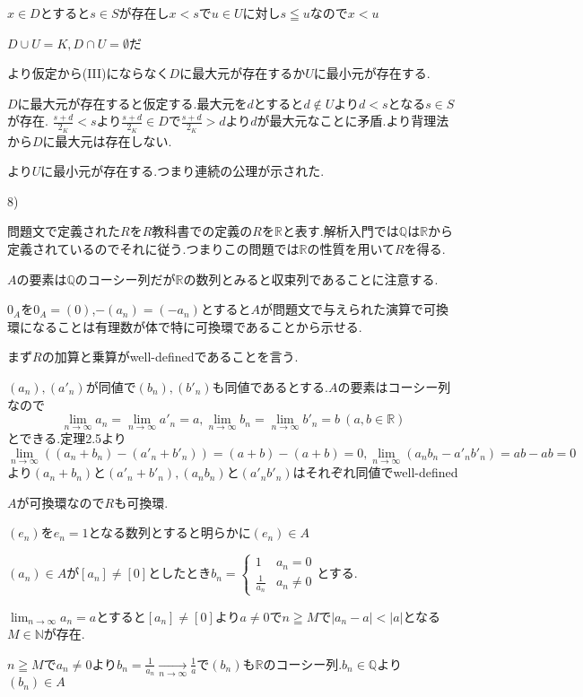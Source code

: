 \documentclass{jsarticle}
\begin{document}
 $x\in D$とすると$s\in S$が存在し$x < s$で$u\in U$に対し$s\leqq u$なので$x < u$
 
 $D\cup U = K,D\cap U=\emptyset$だ
 
 より仮定から(III)にならなく$D$に最大元が存在するか$U$に最小元が存在する.
 
 $D$に最大元が存在すると仮定する.最大元を$d$とすると$d\notin U$より$d < s$となる$s\in S$が存在.
 $\frac{s+d}{2_K}<s$より$\frac{s+d}{2_K}\in D$で$\frac{s+d}{2_K}>d$より$d$が最大元なことに矛盾.より背理法から$D$に最大元は存在しない.
 
 より$U$に最小元が存在する.つまり連続の公理が示された.

8)

問題文で定義された$R$を$R$教科書での定義の$R$を$\mathbb{R}$と表す.解析入門では$\mathbb{Q}$は$\mathbb{R}$から定義されているのでそれに従う.つまりこの問題では$\mathbb{R}$の性質を用いて$R$を得る.

$A$の要素は$\mathbb{Q}$のコーシー列だが$\mathbb{R}$の数列とみると収束列であることに注意する.

$0_A$を$0_A=(0)$,$-(a_n)=(-a_n)$とすると$A$が問題文で与えられた演算で可換環になることは有理数が体で特に可換環であることから示せる.

まず$R$の加算と乗算がwell-definedであることを言う.

$(a_n),(a'_n)$が同値で$(b_n),(b'_n)$も同値であるとする.$A$の要素はコーシー列なので
\[\lim_{n\to\infty}a_n=\lim_{n\to\infty}a'_n=a,\lim_{n\to\infty}b_n=\lim_{n\to\infty}b'_n=b \ (a,b\in\mathbb{R})\]
とできる.定理2.5より
\[\lim_{n\to\infty}((a_n+b_n)-(a'_n+b'_n))=(a+b)-(a+b)=0,\lim_{n\to\infty}(a_nb_n-a'_nb'_n)=ab-ab=0\]
より$(a_n+b_n)$と$(a'_n+b'_n),(a_nb_n)$と$(a'_nb'_n)$はそれぞれ同値でwell-defined

$A$が可換環なので$R$も可換環.

$(e_n)$を$e_n=1$となる数列とすると明らかに$(e_n)\in A$

$(a_n) \in A$が$[a_n]\neq [0]$としたとき$b_n=\begin{cases}
1 & a_n = 0\\
\frac{1}{a_n} & a_n\neq 0
\end{cases}$とする.

$\displaystyle \lim_{n\to\infty}a_n=a$とすると$[a_n]\neq [0]$より$a\neq 0$で$n\geqq M$で$|a_n-a|<|a|$となる$M\in\mathbb{N}$が存在.

$n\geqq M$で$a_n \neq 0$より$b_n=\frac{1}{a_n}\xrightarrow[n\to\infty]{} \frac{1}{a}$で$(b_n)$も$\mathbb{R}$のコーシー列.$b_n\in\mathbb{Q}$より$(b_n)\in A$
\end{document}

